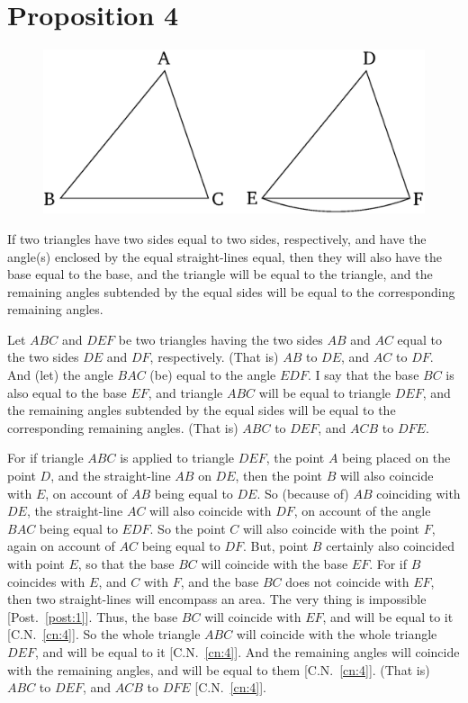 \chapter*{Proposition 4}
\label{prop:4}


\begin{figure}[ht]
    \begin{center}
    \includegraphics[width=0.5\linewidth]{figures/fig04e.eps}
    \label{fig:prop_4}
    \end{center}
\end{figure}

If two triangles have two sides equal to two sides, respectively, and have the
angle(s) enclosed by the equal straight-lines equal, then
they will also have the base equal to the base, and the triangle will be equal
to the triangle, and the remaining angles subtended by the equal sides will be equal to the corresponding remaining angles.

Let $ABC$ and $DEF$ be  two triangles having the two sides $AB$ and $AC$ equal to the two sides $DE$ and $DF$, respectively. (That is) $AB$ to $DE$, and $AC$ to $DF$. And (let) the angle $BAC$ (be) equal to the angle $EDF$. I say that the base $BC$ is also equal to the base
$EF$, and triangle $ABC$ will be equal to triangle $DEF$, and the remaining angles
subtended by the equal sides will be equal to the corresponding remaining angles. (That is) $ABC$ to $DEF$, and $ACB$ to
$DFE$.

For if triangle $ABC$ is applied to triangle $DEF$, the point $A$ being placed
on the point $D$, and the straight-line $AB$ on $DE$, then the point $B$ will also coincide with $E$, on account of $AB$ being equal to $DE$. So (because of) $AB$ coinciding with $DE$, the straight-line $AC$ will also coincide with $DF$, on account of the angle $BAC$ being equal to $EDF$. So the point $C$ will also coincide with the
point $F$,  again on account of $AC$ being equal to $DF$.  But,  point $B$  certainly also coincided with point $E$, so that the base $BC$ will coincide with the base $EF$.
For if $B$ coincides with $E$, and $C$ with $F$, and the base $BC$ does not coincide with $EF$, then two straight-lines will encompass an area. The very thing is impossible [Post.~\ref{post:1}]. Thus, the base $BC$ will coincide with $EF$, and will be equal to it [C.N.~\ref{cn:4}]. So  the whole triangle $ABC$ will coincide with the whole triangle $DEF$, and will be equal to it [C.N.~\ref{cn:4}]. And the remaining angles will coincide with the remaining angles, and  will be equal to them [C.N.~\ref{cn:4}]. (That is) $ABC$ to $DEF$, and $ACB$
to $DFE$ [C.N.~\ref{cn:4}].

